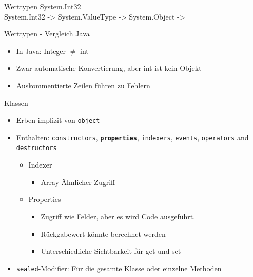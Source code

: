 \documentclass[11pt]{beamer}
\begin{document}
\begin{frame}{Werttypen}
System.Int32 \\ %
System.Int32 -> System.ValueType -> System.Object ->
\end{frame}


\begin{frame}{Werttypen - Vergleich Java}
	\begin{itemize}
		\item In Java: Integer $\neq$ int
		\item Zwar automatische Konvertierung, aber int ist kein Objekt
		\item Auskommentierte Zeilen führen zu Fehlern
	\end{itemize}
	
\end{frame}

\begin{frame}{Klassen}

	\begin{itemize}
		\item Erben implizit von \texttt{object}
		\item  Enthalten: \texttt{constructors}, \textbf{\texttt{properties}}, \texttt{indexers}, \texttt{events}, \texttt{operators} and \texttt{destructors}
			\begin{itemize}
				\item Indexer
				\begin{itemize}
					\item Array Ähnlicher Zugriff
				\end{itemize}
				\item Properties 
				\begin{itemize}
					\item Zugriff wie Felder, aber es wird Code ausgeführt. 
					\item Rückgabewert könnte berechnet werden
					\item Unterschiedliche Sichtbarkeit für \glqq get\grqq{} und \glqq set\grqq
				\end{itemize}
			\end{itemize}
			 \item \texttt{sealed}-Modifier: Für die gesamte Klasse oder einzelne Methoden					\end{itemize}
\end{frame}
\end{document}

